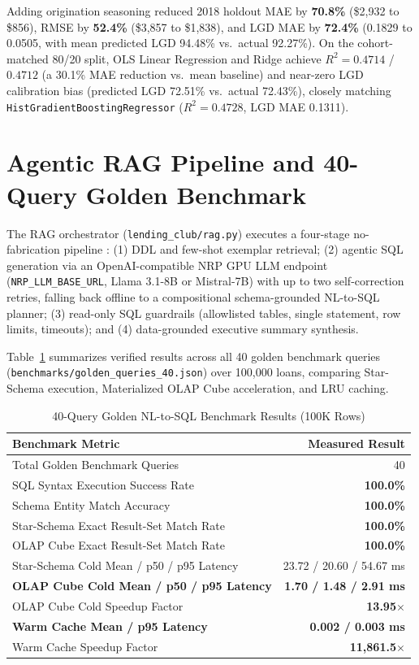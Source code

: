 \documentclass[conference]{IEEEtran}
\begin{document}
Adding origination seasoning reduced 2018 holdout MAE by \textbf{70.8\%} (\$2,932 to \$856), RMSE by \textbf{52.4\%} (\$3,857 to \$1,838), and LGD MAE by \textbf{72.4\%} (0.1829 to 0.0505, with mean predicted LGD 94.48\% vs.\ actual 92.27\%). On the cohort-matched 80/20 split, OLS Linear Regression and Ridge achieve $R^2=0.4714$ / $0.4712$ (a 30.1\% MAE reduction vs.\ mean baseline) and near-zero LGD calibration bias (predicted LGD 72.51\% vs.\ actual 72.43\%), closely matching \texttt{HistGradientBoostingRegressor} ($R^2=0.4728$, LGD MAE 0.1311).

\section{Agentic RAG Pipeline and 40-Query Golden Benchmark}
The RAG orchestrator (\texttt{lending\_club/rag.py}) executes a four-stage no-fabrication pipeline \cite{rag,textsql}: (1) DDL and few-shot exemplar retrieval; (2) agentic SQL generation via an OpenAI-compatible NRP GPU LLM endpoint (\texttt{NRP\_LLM\_BASE\_URL}, Llama 3.1-8B \cite{llama} or Mistral-7B) with up to two self-correction retries, falling back offline to a compositional schema-grounded NL-to-SQL planner; (3) read-only SQL guardrails (allowlisted tables, single statement, row limits, timeouts); and (4) data-grounded executive summary synthesis.

Table~\ref{tab:benchmark} summarizes verified results across all 40 golden benchmark queries (\texttt{benchmarks/golden\_queries\_40.json}) over 100,000 loans, comparing Star-Schema execution, Materialized OLAP Cube acceleration, and LRU caching.
\begin{table}[!t]
\caption{40-Query Golden NL-to-SQL Benchmark Results (100K Rows)}
\label{tab:benchmark}
\centering
\small
\begin{tabularx}{\columnwidth}{@{}X r@{}}
\toprule
\textbf{Benchmark Metric} & \textbf{Measured Result}\\
\midrule
Total Golden Benchmark Queries & 40\\
SQL Syntax Execution Success Rate & \textbf{100.0\%}\\
Schema Entity Match Accuracy & \textbf{100.0\%}\\
Star-Schema Exact Result-Set Match Rate & \textbf{100.0\%}\\
OLAP Cube Exact Result-Set Match Rate & \textbf{100.0\%}\\
Star-Schema Cold Mean / p50 / p95 Latency & 23.72 / 20.60 / 54.67 ms\\
\textbf{OLAP Cube Cold Mean / p50 / p95 Latency} & \textbf{1.70 / 1.48 / 2.91 ms}\\
OLAP Cube Cold Speedup Factor & \textbf{13.95$\times$}\\
\textbf{Warm Cache Mean / p95 Latency} & \textbf{0.002 / 0.003 ms}\\
Warm Cache Speedup Factor & \textbf{11,861.5$\times$}\\
\bottomrule
\end{tabularx}
\end{table}
\end{document}
